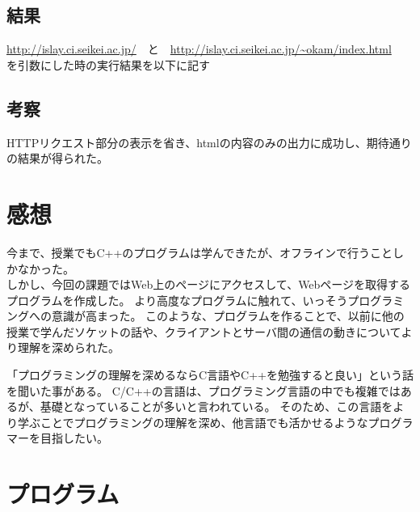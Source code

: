 \documentclass[a4j]{jarticle}
\begin{document}
\subsection{結果}
\url{http://islay.ci.seikei.ac.jp/}　と　\url{http://islay.ci.seikei.ac.jp/~okam/index.html}　を引数にした時の実行結果を以下に記す





\subsection{考察}
HTTPリクエスト部分の表示を省き、htmlの内容のみの出力に成功し、期待通りの結果が得られた。
\newpage
\section{感想}
今まで、授業でもC++のプログラムは学んできたが、オフラインで行うことしかなかった。\\
しかし、今回の課題ではWeb上のページにアクセスして、Webページを取得するプログラムを作成した。
より高度なプログラムに触れて、いっそうプログラミングへの意識が高まった。
このような、プログラムを作ることで、以前に他の授業で学んだソケットの話や、クライアントとサーバ間の通信の動きについてより理解を深められた。

「プログラミングの理解を深めるならC言語やC++を勉強すると良い」という話を聞いた事がある。
C/C++の言語は、プログラミング言語の中でも複雑ではあるが、基礎となっていることが多いと言われている。
そのため、この言語をより学ぶことでプログラミングの理解を深め、他言語でも活かせるようなプログラマーを目指したい。


\section{プログラム}

\end{document}
